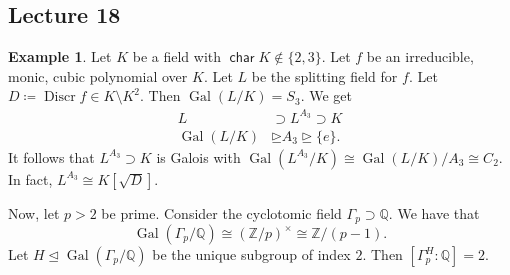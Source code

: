 \documentclass[10pt,letterpaper,cm]{nupset}
\theoremstyle{definition}
\newtheorem{exmp}[definition]{Example}
\theoremstyle{theorem}
\theoremstyle{remark}
\newcommand{\Q}{\mathbb Q}
\newcommand{\Z}{\mathbb Z}
\newcommand{\1}{\mathbf{1}}
\newcommand{\0}{\vec 0}
\DeclareMathOperator{\Char}{\mathsf{char}}
\DeclareMathOperator{\gal}{Gal}
\DeclareMathOperator{\disc}{Discr}
\begin{document}
\subsection{Lecture 18}

\begin{exmp}
Let $K$ be a field with $\Char{K} \notin \{2,3\}$. Let $f$ be an irreducible, monic, cubic polynomial over $K$. Let $L$ be the splitting field for $f$. Let $D\coloneqq  \disc{f} \in K \setminus K^2$. Then $\gal(L/K) = S_3$. We get
\begin{align*} L & \supset L^{A_3} \supset K  \\   \gal(L/K)  & \unrhd A_3 \unrhd \{e\}  . \end{align*} It follows that $L^{A_3}\supset K$ is Galois with $\gal(L^{A_3}/K) \cong \gal(L/K)/A_3 \cong C_2$. In fact, $L^{A_3} \cong K[\sqrt{D}]$.
\end{exmp}

\smallskip

Now, let $p>2$ be prime. Consider the cyclotomic field $\Gamma_p \supset \Q$. We have that $$   \gal(\Gamma_p/\Q) \cong (\Z/p)^{\times} \cong \Z/(p-1) .$$ Let $H \unlhd \gal(\Gamma_p/\Q)$ be the unique subgroup of index $2$. Then $\left[\Gamma_p^H :\Q\right] =2$.
\end{document}
